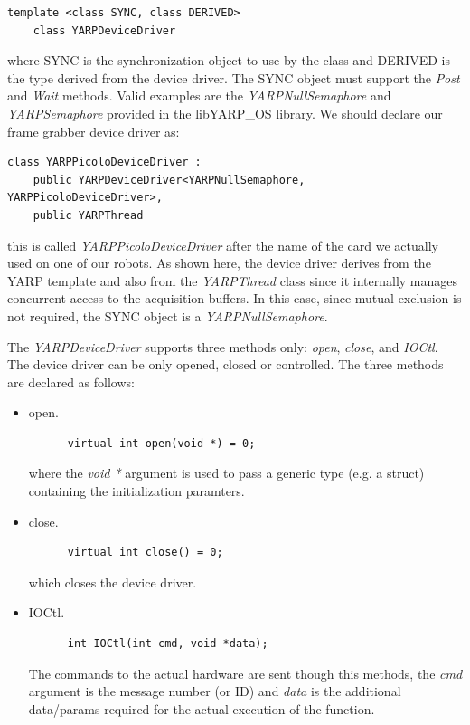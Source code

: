 \begin{verbatim}
template <class SYNC, class DERIVED> 
    class YARPDeviceDriver
\end{verbatim}

\noindent where SYNC is the synchronization object to use by the class and DERIVED is the type derived from the device driver. The SYNC object must support the {\em Post} and {\em Wait} methods. Valid examples are the {\em YARPNullSemaphore} and {\em YARPSemaphore} provided in the libYARP\_OS library. We should declare our frame grabber device driver as:

\begin{verbatim}
class YARPPicoloDeviceDriver : 
    public YARPDeviceDriver<YARPNullSemaphore, YARPPicoloDeviceDriver>, 
    public YARPThread
\end{verbatim}

\noindent this is called {\em YARPPicoloDeviceDriver} after the name of the card we actually used on one of our robots. As shown here, the device driver derives from the YARP template and also from the {\em YARPThread} class since it internally manages concurrent access to the acquisition buffers. In this case, since mutual exclusion is not required, the SYNC object is a {\em YARPNullSemaphore}.

The {\em YARPDeviceDriver} supports three methods only: {\em open}, {\em close}, and {\em IOCtl}. The device driver can be only opened, closed or controlled. The three methods are declared as follows:
\begin{itemize}

\item open.
\begin{verbatim}
      virtual int open(void *) = 0;		
\end{verbatim}
where the {\em void *} argument is used to pass a generic type (e.g. a struct) containing the initialization paramters.

\item close.
\begin{verbatim}
      virtual int close() = 0;
\end{verbatim}
which closes the device driver.

\item IOCtl.
\begin{verbatim}
      int IOCtl(int cmd, void *data);
\end{verbatim}
The commands to the actual hardware are sent though this methods, the {\em cmd} argument is the message number (or ID) and {\em data} is the additional data/params required for the actual execution of the function.

\end{itemize}

